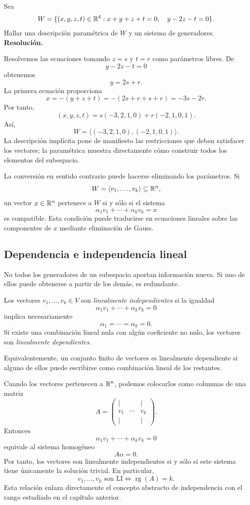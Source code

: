 \begin{solvedexercise}
Sea
\[
W=\{(x,y,z,t)\in\mathbb{R}^4:x+y+z+t=0,\quad y-2z-t=0\}.
\]
Hallar una descripción paramétrica de $W$ y un sistema de generadores.
\tcblower
\textbf{Resolución.}\par\smallskip
Resolvemos las ecuaciones tomando $z=s$ y $t=r$ como parámetros libres. De
\[
y-2z-t=0
\]
obtenemos
\[
y=2s+r.
\]
La primera ecuación proporciona
\[
x=-(y+z+t)=-(2s+r+s+r)=-3s-2r.
\]
Por tanto,
\[
(x,y,z,t)
=s(-3,2,1,0)+r(-2,1,0,1).
\]
Así,
\[
\boxed{W=\langle(-3,2,1,0),(-2,1,0,1)\rangle.}
\]
La descripción implícita pone de manifiesto las restricciones que deben satisfacer los vectores; la paramétrica muestra directamente cómo construir todos los elementos del subespacio.
\end{solvedexercise}

La conversión en sentido contrario puede hacerse eliminando los parámetros. Si
\[
W=\langle v_1,\ldots,v_k\rangle\subseteq\mathbb{R}^n,
\]
un vector $x\in\mathbb{R}^n$ pertenece a $W$ si y sólo si el sistema
\[
\alpha_1v_1+\cdots+\alpha_kv_k=x
\]
es compatible. Esta condición puede traducirse en ecuaciones lineales sobre las componentes de $x$ mediante eliminación de Gauss.

\subsection{Dependencia e independencia lineal}

No todos los generadores de un subespacio aportan información nueva. Si uno de ellos puede obtenerse a partir de los demás, es redundante.

\begin{definition}
Los vectores $v_1,\ldots,v_k\in V$ son \emph{linealmente independientes} si la igualdad
\[
\alpha_1v_1+\cdots+\alpha_kv_k=0
\]
implica necesariamente
\[
\alpha_1=\cdots=\alpha_k=0.
\]
Si existe una combinación lineal nula con algún coeficiente no nulo, los vectores son \emph{linealmente dependientes}.
\end{definition}

Equivalentemente, un conjunto finito de vectores es linealmente dependiente si alguno de ellos puede escribirse como combinación lineal de los restantes.

Cuando los vectores pertenecen a $\mathbb{R}^n$, podemos colocarlos como columnas de una matriz
\[
A=\begin{pmatrix}|&&|\\v_1&\cdots&v_k\\|&&|\end{pmatrix}.
\]
Entonces
\[
\alpha_1v_1+\cdots+\alpha_kv_k=0
\]
equivale al sistema homogéneo
\[
A\alpha=0.
\]
Por tanto, los vectores son linealmente independientes si y sólo si este sistema tiene únicamente la solución trivial. En particular,
\[
\boxed{v_1,\ldots,v_k\text{ son LI}\iff \operatorname{rg}(A)=k.}
\]
Esta relación enlaza directamente el concepto abstracto de independencia con el rango estudiado en el capítulo anterior.

